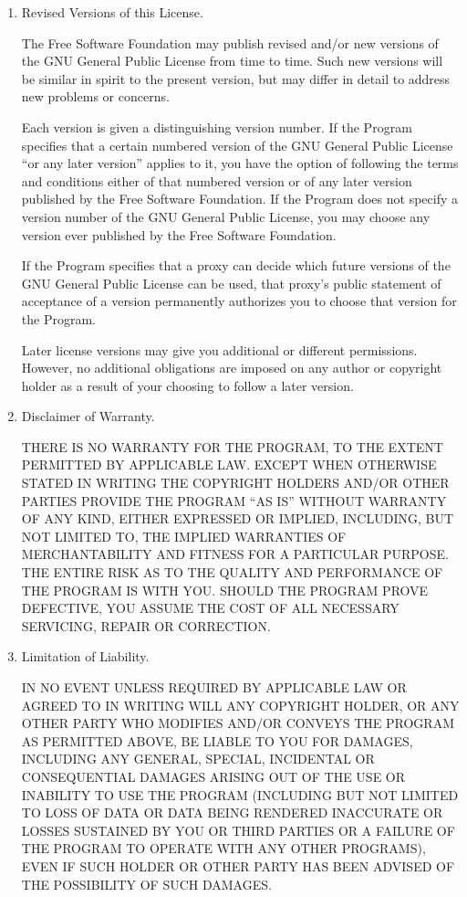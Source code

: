 \documentclass[11pt]{article}
\begin{document}
\begin{enumerate}
\item Revised Versions of this License.

The Free Software Foundation may publish revised and/or new versions of
the GNU General Public License from time to time.  Such new versions will
be similar in spirit to the present version, but may differ in detail to
address new problems or concerns.

Each version is given a distinguishing version number.  If the
Program specifies that a certain numbered version of the GNU General
Public License ``or any later version'' applies to it, you have the
option of following the terms and conditions either of that numbered
version or of any later version published by the Free Software
Foundation.  If the Program does not specify a version number of the
GNU General Public License, you may choose any version ever published
by the Free Software Foundation.

If the Program specifies that a proxy can decide which future
versions of the GNU General Public License can be used, that proxy's
public statement of acceptance of a version permanently authorizes you
to choose that version for the Program.

Later license versions may give you additional or different
permissions.  However, no additional obligations are imposed on any
author or copyright holder as a result of your choosing to follow a
later version.

\item Disclaimer of Warranty.

\begin{sloppypar}
 THERE IS NO WARRANTY FOR THE PROGRAM, TO THE EXTENT PERMITTED BY
 APPLICABLE LAW.  EXCEPT WHEN OTHERWISE STATED IN WRITING THE
 COPYRIGHT HOLDERS AND/OR OTHER PARTIES PROVIDE THE PROGRAM ``AS IS''
 WITHOUT WARRANTY OF ANY KIND, EITHER EXPRESSED OR IMPLIED,
 INCLUDING, BUT NOT LIMITED TO, THE IMPLIED WARRANTIES OF
 MERCHANTABILITY AND FITNESS FOR A PARTICULAR PURPOSE.  THE ENTIRE
 RISK AS TO THE QUALITY AND PERFORMANCE OF THE PROGRAM IS WITH YOU.
 SHOULD THE PROGRAM PROVE DEFECTIVE, YOU ASSUME THE COST OF ALL
 NECESSARY SERVICING, REPAIR OR CORRECTION.
\end{sloppypar}

\item Limitation of Liability.

 IN NO EVENT UNLESS REQUIRED BY APPLICABLE LAW OR AGREED TO IN
 WRITING WILL ANY COPYRIGHT HOLDER, OR ANY OTHER PARTY WHO MODIFIES
 AND/OR CONVEYS THE PROGRAM AS PERMITTED ABOVE, BE LIABLE TO YOU FOR
 DAMAGES, INCLUDING ANY GENERAL, SPECIAL, INCIDENTAL OR CONSEQUENTIAL
 DAMAGES ARISING OUT OF THE USE OR INABILITY TO USE THE PROGRAM
 (INCLUDING BUT NOT LIMITED TO LOSS OF DATA OR DATA BEING RENDERED
 INACCURATE OR LOSSES SUSTAINED BY YOU OR THIRD PARTIES OR A FAILURE
 OF THE PROGRAM TO OPERATE WITH ANY OTHER PROGRAMS), EVEN IF SUCH
 HOLDER OR OTHER PARTY HAS BEEN ADVISED OF THE POSSIBILITY OF SUCH
 DAMAGES.


\end{enumerate}
\end{document}
